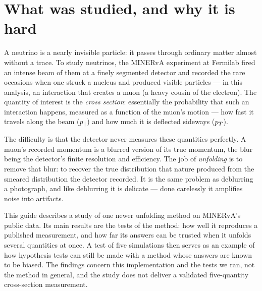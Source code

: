 
\section{What was studied, and why it is hard}

A neutrino is a nearly invisible particle: it passes through ordinary matter almost without a trace. To study neutrinos, the MINERvA experiment at Fermilab fired an intense beam of them at a finely segmented detector and recorded the rare occasions when one struck a nucleus and produced visible particles --- in this analysis, an interaction that creates a muon (a heavy cousin of the electron). The quantity of interest is the \emph{cross section}: essentially the probability that such an interaction happens, measured as a function of the muon's motion --- how fast it travels along the beam ($p_{\parallel}$) and how much it is deflected sideways ($p_{T}$).

The difficulty is that the detector never measures these quantities perfectly. A muon's recorded momentum is a blurred version of its true momentum, the blur being the detector's finite resolution and efficiency. The job of \emph{unfolding} is to remove that blur: to recover the true distribution that nature produced from the smeared distribution the detector recorded. It is the same problem as deblurring a photograph, and like deblurring it is delicate --- done carelessly it amplifies noise into artifacts.

This guide describes a study of one newer unfolding method on MINERvA's public data. Its main results are the tests of the method: how well it reproduces a published measurement, and how far its answers can be trusted when it unfolds several quantities at once. A test of five simulations then serves as an example of how hypothesis tests can still be made with a method whose answers are known to be biased. The findings concern this implementation and the tests we ran, not the method in general, and the study does not deliver a validated five-quantity cross-section measurement.

